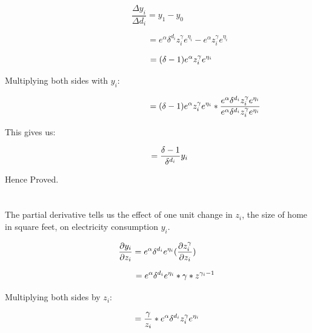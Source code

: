 \documentclass{article}
\begin{document}
\begin{equation}
    \frac{\Delta y_i}{\Delta d_i} =  y_1 - y_0
\end{equation}

\begin{equation}
   \hspace{3cm} = e^\alpha\delta^{d_i}z^\gamma_ie^{\eta_i} - e^{\alpha}z^\gamma_ie^{\eta_i}
\end{equation}

\begin{equation}
   \hspace{20mm} = (\delta - 1)e^{\alpha}z^\gamma_ie^{\eta_i}
\end{equation}

Multiplying both sides with $y_i$:

\begin{equation}
   \hspace{40mm} = (\delta - 1)e^{\alpha}z^\gamma_ie^{\eta_i}* \frac{e^\alpha\delta^{d_i}z^\gamma_ie^{\eta_i}}{e^\alpha\delta^{d_i}z^\gamma_ie^{\eta_i}} 
\end{equation}

This gives us: 

\begin{equation}
   \hspace{10mm} = \frac{\delta - 1}{\delta^{d_i}}y_i
\end{equation}

Hence Proved.
\newline
\newline

\section{}
The partial derivative tells us the effect of one unit change in $z_i$, the size of home in square feet, on electricity consumption $y_i$. 

\begin{equation}
    \pdv{y_i}{z_i} = e^\alpha\delta^{d_i}e^{\eta_i}(\pdv{z^\gamma_i}{z_i})
\end{equation}

\begin{equation}
   \hspace{15mm} = e^\alpha\delta^{d_i}e^{\eta_i} * \gamma  * z^{\gamma_i - 1}
\end{equation}

Multiplying both sides by $z_i$:

\begin{equation}
   \hspace{8mm} = \frac{\gamma}{z_i} * e^\alpha\delta^{d_i}z^\gamma_ie^{\eta_i}
\end{equation}
\end{document}
